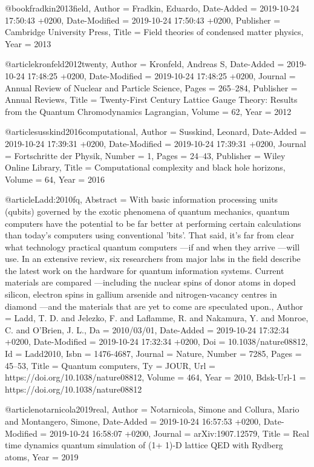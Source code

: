 \documentclass[epj,final]{svjour}
\begin{document}
@book{fradkin2013field,
	Author = {Fradkin, Eduardo},
	Date-Added = {2019-10-24 17:50:43 +0200},
	Date-Modified = {2019-10-24 17:50:43 +0200},
	Publisher = {Cambridge University Press},
	Title = {Field theories of condensed matter physics},
	Year = {2013}}

@article{kronfeld2012twenty,
	Author = {Kronfeld, Andreas S},
	Date-Added = {2019-10-24 17:48:25 +0200},
	Date-Modified = {2019-10-24 17:48:25 +0200},
	Journal = {Annual Review of Nuclear and Particle Science},
	Pages = {265--284},
	Publisher = {Annual Reviews},
	Title = {Twenty-First Century Lattice Gauge Theory: Results from the Quantum Chromodynamics Lagrangian},
	Volume = {62},
	Year = {2012}}

@article{susskind2016computational,
	Author = {Susskind, Leonard},
	Date-Added = {2019-10-24 17:39:31 +0200},
	Date-Modified = {2019-10-24 17:39:31 +0200},
	Journal = {Fortschritte der Physik},
	Number = {1},
	Pages = {24--43},
	Publisher = {Wiley Online Library},
	Title = {Computational complexity and black hole horizons},
	Volume = {64},
	Year = {2016}}

@article{Ladd:2010fq,
	Abstract = {With basic information processing units (qubits) governed by the exotic phenomena of quantum mechanics, quantum computers have the potential to be far better at performing certain calculations than today's computers using conventional 'bits'. That said, it's far from clear what technology practical quantum computers ---if and when they arrive ---will use. In an extensive review, six researchers from major labs in the field describe the latest work on the hardware for quantum information systems. Current materials are compared ---including the nuclear spins of donor atoms in doped silicon, electron spins in gallium arsenide and nitrogen-vacancy centres in diamond ---and the materials that are yet to come are speculated upon.},
	Author = {Ladd, T. D. and Jelezko, F. and Laflamme, R. and Nakamura, Y. and Monroe, C. and O'Brien, J. L.},
	Da = {2010/03/01},
	Date-Added = {2019-10-24 17:32:34 +0200},
	Date-Modified = {2019-10-24 17:32:34 +0200},
	Doi = {10.1038/nature08812},
	Id = {Ladd2010},
	Isbn = {1476-4687},
	Journal = {Nature},
	Number = {7285},
	Pages = {45--53},
	Title = {Quantum computers},
	Ty = {JOUR},
	Url = {https://doi.org/10.1038/nature08812},
	Volume = {464},
	Year = {2010},
	Bdsk-Url-1 = {https://doi.org/10.1038/nature08812}}

@article{notarnicola2019real,
	Author = {Notarnicola, Simone and Collura, Mario and Montangero, Simone},
	Date-Added = {2019-10-24 16:57:53 +0200},
	Date-Modified = {2019-10-24 16:58:07 +0200},
	Journal = {arXiv:1907.12579},
	Title = {Real time dynamics quantum simulation of (1+ 1)-D lattice QED with Rydberg atoms},
	Year = {2019}}
\end{document}
